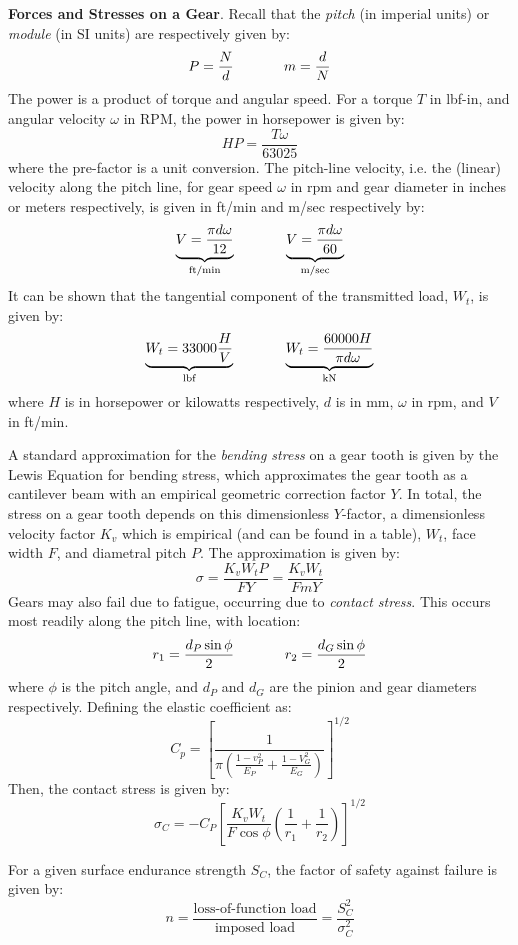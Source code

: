 \begin{framed}
    \textbf{Forces and Stresses on a Gear}. Recall that the \textit{pitch} (in imperial units) or \textit{module} (in SI units) are respectively given by: \[P=\frac{N}{d}\hspace{0.5in}m=\frac{d}{N}\] The power is a product of torque and angular speed. For a torque $T$ in lbf-in, and angular velocity $\omega$ in RPM, the  power in horsepower is given by: \[HP = \frac{T\omega}{63025}\] where the pre-factor is a unit conversion. The pitch-line velocity, i.e. the (linear) velocity along the pitch line, for gear speed $\omega$ in rpm and gear diameter in inches or meters respectively, is given in ft/min and m/sec respectively by: \[\underbrace{V = \frac{\pi d\omega}{12}}_\text{ft/min}\hspace{0.5in} \underbrace{V=\frac{\pi d\omega}{60}}_\text{m/sec}\] It can be shown that the tangential component of the transmitted load, $W_t$, is given by: \[\underbrace{W_t = 33000\frac{H}{V}}_\text{lbf}\hspace{0.5in} \underbrace{W_t = \frac{60000H}{\pi d\omega}}_\text{kN}\] where $H$ is in horsepower or kilowatts respectively, $d$ is in mm, $\omega$ in rpm, and $V$ in ft/min.

    A standard approximation for the \textit{bending stress} on a gear tooth is given by the Lewis Equation for bending stress, which approximates the gear tooth as a cantilever beam with an empirical geometric correction factor $Y$. In total, the stress on a gear tooth depends on this dimensionless $Y$-factor, a dimensionless velocity factor $K_v$ which is empirical (and can be found in a table), $W_t$, face width $F$, and diametral pitch $P$. The approximation is given by: \[\sigma = \frac{K_v W_t P}{FY} = \frac{K_v W_t}{FmY}\] Gears may also fail due to fatigue, occurring due to \textit{contact stress}. This occurs most readily along the pitch line, with location: \[r_1 = \frac{d_P \sin\phi}{2}\hspace{0.5in} r_2 = \frac{d_G\sin \phi}{2}\] where $\phi$ is the pitch angle, and $d_P$ and $d_G$ are the pinion and gear diameters respectively. Defining the elastic coefficient as: \[C_p = \left[\frac{1}{\pi\left(\frac{1-v_P^2}{E_P} + \frac{1-V_G^2}{E_G}\right)}\right]^{1/2}\] Then, the contact stress is given by: \[\sigma_C = -C_P\left[\frac{K_vW_t}{F\cos\phi}\left(\frac{1}{r_1} + \frac{1}{r_2}\right)\right]^{1/2}\]

    For a given surface endurance strength $S_C$, the factor of safety against failure is given by: \[n = \frac{\text{loss-of-function load}}{\text{imposed load}} = \frac{S_C^2}{\sigma_C^2}\]
\end{framed}

